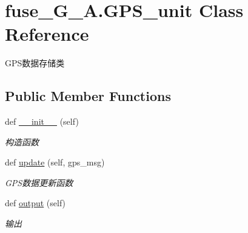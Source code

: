 \hypertarget{classfuse___g___a_1_1_g_p_s__unit}{}\section{fuse\+\_\+\+G\+\_\+\+A.\+G\+P\+S\+\_\+unit Class Reference}
\label{classfuse___g___a_1_1_g_p_s__unit}


G\+P\+S数据存储类  


\subsection*{Public Member Functions}
\begin{DoxyCompactItemize}
\item 
def \hyperlink{classfuse___g___a_1_1_g_p_s__unit_ab1460cfab04ea31eb242f739415f60ea}{\+\_\+\+\_\+init\+\_\+\+\_\+} (self)
\begin{DoxyCompactList}\small\item\em 构造函数 \end{DoxyCompactList}\item 
def \hyperlink{classfuse___g___a_1_1_g_p_s__unit_ae1b5d6c2cf7e6334f8c035b2b134e9e7}{update} (self, gps\+\_\+msg)
\begin{DoxyCompactList}\small\item\em G\+P\+S数据更新函数 \end{DoxyCompactList}\item 
def \hyperlink{classfuse___g___a_1_1_g_p_s__unit_a50b4c8d0b8d134170b9028533b45322d}{output} (self)
\begin{DoxyCompactList}\small\item\em 输出 \end{DoxyCompactList}\end{DoxyCompactItemize}
